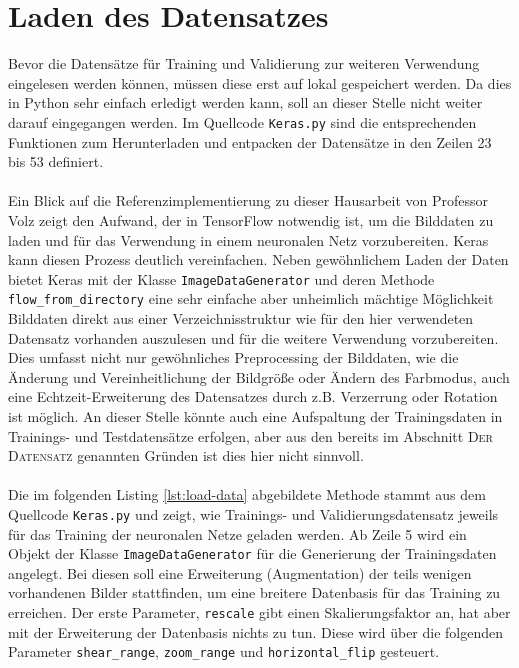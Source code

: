 \section{Laden des Datensatzes}
Bevor die Datensätze für Training und Validierung zur weiteren Verwendung eingelesen werden können, müssen diese erst auf lokal gespeichert werden. Da dies in Python sehr einfach erledigt werden kann, soll an dieser Stelle nicht weiter darauf eingegangen werden. Im Quellcode \texttt{Keras.py} sind die entsprechenden Funktionen zum Herunterladen und entpacken der Datensätze in den Zeilen 23 bis 53 definiert. \\
\\
Ein Blick auf die Referenzimplementierung zu dieser Hausarbeit von Professor Volz zeigt den Aufwand, der in TensorFlow notwendig ist, um die Bilddaten zu laden und für das Verwendung in einem neuronalen Netz vorzubereiten. Keras kann diesen Prozess deutlich vereinfachen. Neben gewöhnlichem Laden der Daten bietet Keras mit der Klasse \texttt{ImageDataGenerator} und deren Methode \texttt{flow\_from\_directory} eine sehr einfache aber unheimlich mächtige Möglichkeit Bilddaten direkt aus einer Verzeichnisstruktur wie für den hier verwendeten Datensatz vorhanden auszulesen und für die weitere Verwendung vorzubereiten. Dies umfasst nicht nur gewöhnliches Preprocessing der Bilddaten, wie die Änderung und Vereinheitlichung der Bildgröße oder Ändern des Farbmodus, auch eine Echtzeit-Erweiterung des Datensatzes durch z.B. Verzerrung oder Rotation ist möglich. An dieser Stelle könnte auch eine Aufspaltung der Trainingsdaten in Trainings- und Testdatensätze erfolgen, aber aus den bereits im Abschnitt \textsc{Der Datensatz} genannten Gründen ist dies hier nicht sinnvoll.\\
\\
Die im folgenden Listing \ref{lst:load-data} abgebildete Methode stammt aus dem Quellcode \texttt{Keras.py} und zeigt, wie Trainings- und Validierungsdatensatz jeweils für das Training der neuronalen Netze geladen werden.
Ab Zeile 5 wird ein Objekt der Klasse \texttt{ImageDataGenerator} für die Generierung der Trainingsdaten angelegt. Bei diesen soll eine Erweiterung (Augmentation) der teils wenigen vorhandenen Bilder stattfinden, um eine breitere Datenbasis für das Training zu erreichen. Der erste Parameter, \texttt{rescale} gibt einen Skalierungsfaktor an, hat aber mit der Erweiterung der Datenbasis nichts zu tun. Diese wird über die folgenden Parameter \texttt{shear\_range}, \texttt{zoom\_range} und \texttt{horizontal\_flip} gesteuert. \\
